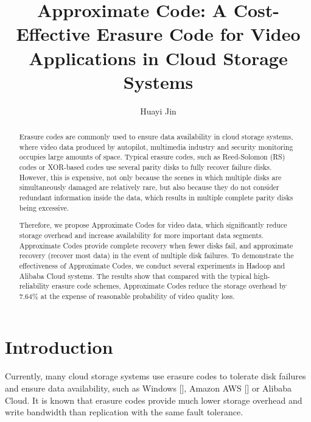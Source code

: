 \documentclass[sigconf]{acmart}
\begin{document}
\title{Approximate Code: A Cost-Effective Erasure Code for Video Applications in Cloud Storage Systems}

\author{Huayi Jin}

\begin{abstract}
Erasure codes are commonly used to ensure data availability in cloud storage systems, where video data produced by autopilot, multimedia industry and security monitoring occupies large amounts of space. 
Typical erasure codes, such as Reed-Solomon (RS) \cite{macwilliams1977theory} codes or XOR-based codes use several parity disks to fully recover failure disks. 
However, this is expensive, not only because the scenes in which multiple disks are simultaneously damaged are relatively rare, but also because they do not consider redundant information inside the data, which results in multiple complete parity disks being excessive.   

Therefore, we propose Approximate Codes for video data, which significantly reduce storage overhead and increase availability for more important data segments.
Approximate Codes provide complete recovery when fewer disks fail, and approximate recovery (recover most data) in the event of multiple disk failures.
To demonstrate the effectiveness of Approximate Codes, we conduct several experiments in Hadoop and Alibaba Cloud systems.
The results show that compared with the typical high-reliability erasure code schemes, Approximate Codes reduce the storage overhead by 7.64\% at the expense of reasonable probability of video quality loss.
\end{abstract}

%
%

\maketitle

\section{Introduction}
Currently, many cloud storage systems use erasure codes to tolerate disk failures and ensure data availability, such as Windows [], Amazon AWS [] or Alibaba Cloud. It is known that erasure codes provide much lower storage overhead and write bandwidth than replication with the same fault tolerance.
\end{document}
